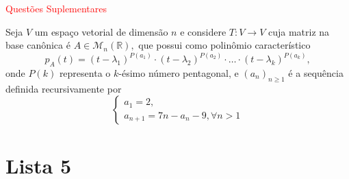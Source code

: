 \documentclass[11pt,a4paper]{article}
\begin{document}
\textcolor{Red}{Questões Suplementares}

 Seja $V$ um espaço vetorial de dimensão $n$ e considere $T \colon V \to V$ cuja matriz na base canônica é $A \in \mathcal{M}_n(\mathbb{R}),$ que possui como polinômio característico
\[
p_A(t) = (t - \lambda_1)^{P(a_1)} \cdot (t - \lambda_2)^{P(a_2)} \cdot \ldots \cdot (t - \lambda_k)^{P(a_k)},
\]
onde $P(k)$ representa o $k$-ésimo número pentagonal, e $(a_n)_{n \ge 1}$ é a sequência definida recursivamente por
\[\begin{cases}
a_1 = 2,\\
a_{n+1} = 7n - a_{n} - 9, \forall n > 1
\end{cases}\]
\solucao{}
\newpage
\section{\textcolor{Floresta}{Lista 5}}
\end{document}

